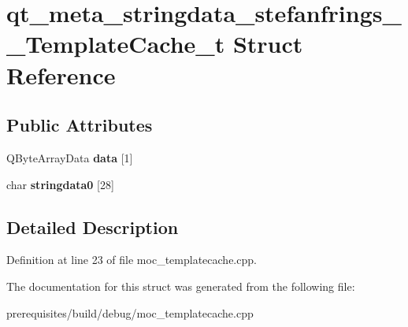 \hypertarget{structqt__meta__stringdata__stefanfrings_____template_cache__t}{}\section{qt\+\_\+meta\+\_\+stringdata\+\_\+stefanfrings\+\_\+\+\_\+\+Template\+Cache\+\_\+t Struct Reference}
\label{structqt__meta__stringdata__stefanfrings_____template_cache__t}
\subsection*{Public Attributes}
\begin{DoxyCompactItemize}
\item 
\mbox{\label{structqt__meta__stringdata__stefanfrings_____template_cache__t_ab18dc60b10ebbbd9e4eae2e116acf1f5}} 
Q\+Byte\+Array\+Data {\bfseries data} \mbox{[}1\mbox{]}
\item 
\mbox{\label{structqt__meta__stringdata__stefanfrings_____template_cache__t_ad0b19156deef69413ea48d89212773ec}} 
char {\bfseries stringdata0} \mbox{[}28\mbox{]}
\end{DoxyCompactItemize}


\subsection{Detailed Description}


Definition at line 23 of file moc\+\_\+templatecache.\+cpp.



The documentation for this struct was generated from the following file\+:\begin{DoxyCompactItemize}
\item 
prerequisites/build/debug/moc\+\_\+templatecache.\+cpp\end{DoxyCompactItemize}
